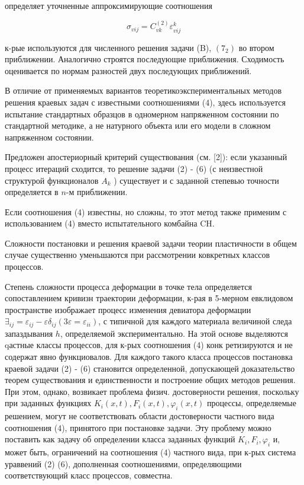 \documentclass[10pt]{article}
\begin{document}
определяет уточненные аппроксимирующие соотношения



\[

\sigma_{v i j}=C_{v k}^{(2)} \varepsilon_{v i j}^{k}

\]



к-рые используются для численного решения задачи (B), $\left(7_{2}\right)$ во втором приближении. Аналогично строятся последующие приближения. Сходимость оценивается по нормам разностей двух последующих приближений.



В отличие от применяемых вариантов теоретикоэкспериментальных методов решения краевых задач с известными соотношениями (4), здесь используется испытание стандартных образцов в одномерном напряженном состоянии по стандартной методике, а не натурного объекта или его модели в сложном напряженном состоянии.



Предложен апостериорный критерий существования (см. [2]): если указанный процесс итераций сходится, то решение задачи (2) - (6) (с неизвестной структурой функционалов $A_{k}$ ) существует и с заданной степевью точности определяется в $n$-м приближении.



Если соотношения (4) известны, но сложны, то этот метод также применим с использованием (4) вместо испытательного комбайна $\mathrm{CH}$.



Сложности постановки и решения краевой задачи теории пластичности в общем случае существенно уменьшаются при рассмотрении ковкретных классов процессов.



Степень сложности процесса деформации в точке тела определяется сопоставлением кривизн траектории деформации, к-рая в 5-мерном евклидовом пространстве изображает процесс изменения девиатора деформации $\exists_{i j}=\varepsilon_{i j}-\varepsilon \delta_{i j}\left(3 \varepsilon=\varepsilon_{i i}\right)$, с типичной для каждого материала величиной следа запаздывания $h$, определяемой экспериментально. На этой основе выделяются qастные классы процессов, для к-рых соотношения (4) конк ретизируются и не содержат явно функциовалов. Для каждого такого класса процессов постановка краевой задачи (2) - (6) становится определенной, допускающей доказательство теорем существования и единственности и построение общих методов решения. При этом, однако, возвикает проблема физич. достоверности решения, поскольку при заданных функциях $K_{i}(x, t), F_{i}(x, t), \varphi_{i}(x, t)$ процессы, определяемые решением, могут не соответствовать области достоверности частного вида соотношения (4), принятого при постановке задачи. Эту проблему можно поставить как задачу об определении класса заданных функций $K_{i}, F_{i}, \varphi_{i}$ и, может быть, ограничений на соотношения (4) частного вида, при к-рых система ураввений (2) (6), дополненная соотношениями, определяющими соответствующий класс процессов, совместна.
\end{document}
